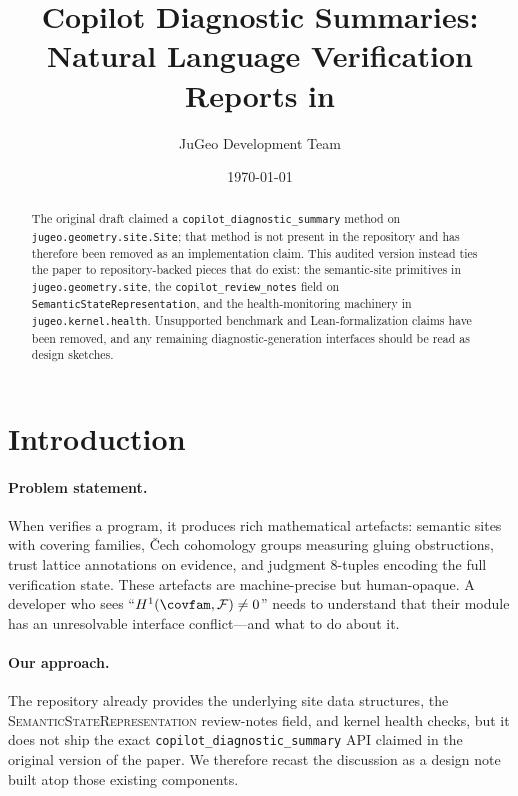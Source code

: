 \documentclass[11pt]{article}
\title{Copilot Diagnostic Summaries:\\
Natural Language Verification Reports in \JuGeo}
\author{JuGeo Development Team}
\date{\today}
\newcommand{\DiagSum}{\texttt{copilot\_diagnostic\_summary}}
\newcommand{\CopRevNotes}{\texttt{copilot\_review\_notes}}
\newcommand{\SemState}{\textsc{SemanticStateRepresentation}}
\begin{document}
\maketitle

\begin{abstract}
The original draft claimed a \DiagSum{} method on
\texttt{jugeo.geometry.site.Site}; that method is not present in the
repository and has therefore been removed as an implementation claim.
This audited version instead ties the paper to repository-backed pieces
that do exist: the semantic-site primitives in
\texttt{jugeo.geometry.site}, the \CopRevNotes{} field on
\texttt{SemanticStateRepresentation}, and the health-monitoring
machinery in \texttt{jugeo.kernel.health}.  Unsupported benchmark and
Lean-formalization claims have been removed, and any remaining
diagnostic-generation interfaces should be read as design sketches.
\end{abstract}

\section{Introduction}\label{sec:intro}

\paragraph{Problem statement.}
When \JuGeo{} verifies a program, it produces rich mathematical artefacts:
semantic sites with covering families, \v{C}ech cohomology groups measuring
gluing obstructions, trust lattice annotations on evidence, and judgment
8-tuples encoding the full verification state.  These artefacts are
machine-precise but human-opaque.  A developer who sees
``$\Hcoh{1}(\covfam, \mathcal{F}) \neq 0$'' needs to understand that their
module has an unresolvable interface conflict---and what to do about it.

\paragraph{Our approach.}
The repository already provides the underlying site data structures, the
\SemState{} review-notes field, and kernel health checks, but it does not
ship the exact \DiagSum{} API claimed in the original version of the
paper.  We therefore recast the discussion as a design note built atop
those existing components.
\end{document}
